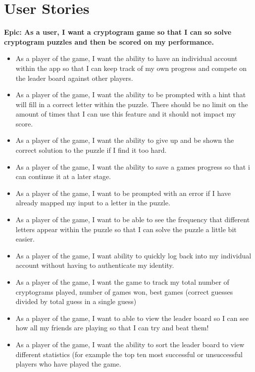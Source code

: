 \documentclass[a4paper,12pt]{article}
\begin{document}
\section{User Stories}


\textbf{Epic: As a user, I want a cryptogram game so that I can so solve cryptogram puzzles and then be scored on my performance.}


\begin{itemize}

  \item As a player of the game, I want the ability to have an individual account within the app so that I can keep track of my own progress and compete on the leader board against other players.

  \item As a player of the game, I want the ability to be prompted with a hint that will fill in a correct letter within the puzzle. There should be no limit on the amount of times that I can use this feature and it should not impact my score.

  \item As a player of the game, I want the ability to give up and be shown the correct solution to the puzzle if I find it too hard. 

  \item As a player of the game, I want the ability to save a games progress so that i can continue it at a later stage. 

  \item As a player of the game, I want to be prompted with an error if I have already mapped my input to a letter in the puzzle.

  \item As a player of the game, I want to be able to see the frequency that different letters appear within the puzzle so that I can solve the puzzle a little bit easier. 

  \item As a player of the game, I want ability to quickly log back into my individual account without having to authenticate my identity. 

  \item As a player of the game, I want the game to track my total number of cryptograms played, number of games won, best games (correct guesses divided by total guess in a single guess)

  \item As a player of the game, I want to able to view the leader board so I can see how all my friends are playing so that I can try and beat them!

  \item As a player of the game, I want the ability to sort the leader board to view different statistics (for example the top ten most successful or unsuccessful players who have played the game. 

\end{itemize}
\end{document}
